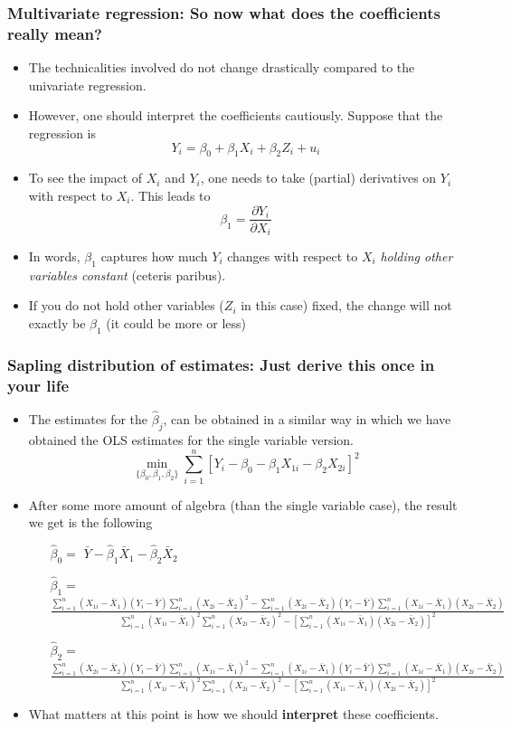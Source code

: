 \documentclass[aspectratio=169]{beamer}
\begin{document}
\begin{frame}
\frametitle{Multivariate regression: So now what does the coefficients really mean?}
\begin{itemize}
\item The technicalities involved do not change drastically compared to the univariate regression. 
\item However, one should interpret the coefficients cautiously. Suppose that the regression is
\[
Y_i = \beta_0 + \beta_1 X_i + \beta_2 Z_i+u_i
\]
\item To see the impact of $X_i$ and $Y_i$, one needs to take (partial) derivatives on $Y_i$ with respect to $X_i$. This leads to
\[
\beta_1 = \frac{\partial Y_i}{\partial X_i}
\]
\item In words, $\beta_1$ captures how much $Y_i$ changes with respect to $X_i$ \emph{holding other variables constant} (ceteris paribus).
\item If you do not hold other variables ($Z_i$ in this case) fixed, the change will not exactly be $\beta_1$ (it could be more or less)

\end{itemize}
\end{frame}

\begin{frame}
\frametitle{Sapling distribution of estimates: Just derive this once in your life}
\begin{itemize}
\item The estimates for the $\hat{\beta}_j$, can be obtained in a similar way in which we have obtained the OLS estimates for the single variable version.
\[
\min_{\{\beta_0,\beta_1,\beta_2\}} \sum_{i=1}^n[Y_i-\beta_0 - \beta_1X_{1i}-\beta_2X_{2i}]^2
\]
\item After some more amount of algebra (than the single variable case), the result we get is the following
\begin{itemize}
\item[$\hat{\beta}_0=$] $\bar{Y}-\hat{\beta}_1\bar{X}_1-\hat{\beta}_2\bar{X}_2$
\item[$\hat{\beta}_1=$] $\frac{\sum_{i=1}^n (X_{1i}-\bar{X}_1)(Y_{i}-\bar{Y})\sum_{i=1}^n(X_{2i}-\bar{X}_2)^2-\sum_{i=1}^n (X_{2i}-\bar{X}_2)(Y_{i}-\bar{Y})\sum_{i=1}^n(X_{1i}-\bar{X}_1)(X_{2i}-\bar{X}_2)}{\sum_{i=1}^n (X_{1i}-\bar{X}_1)^2\sum_{i=1}^n (X_{2i}-\bar{X}_2)^2-[\sum_{i=1}^n (X_{1i}-\bar{X}_1)(X_{2i}-\bar{X}_2)]^2}$
\item[$\hat{\beta}_2=$] $\frac{\sum_{i=1}^n (X_{2i}-\bar{X}_2)(Y_{i}-\bar{Y})\sum_{i=1}^n(X_{1i}-\bar{X}_1)^2-\sum_{i=1}^n (X_{1i}-\bar{X}_1)(Y_{i}-\bar{Y})\sum_{i=1}^n(X_{1i}-\bar{X}_1)(X_{2i}-\bar{X}_2)}{\sum_{i=1}^n (X_{1i}-\bar{X}_1)^2\sum_{i=1}^n (X_{2i}-\bar{X}_2)^2-[\sum_{i=1}^n (X_{1i}-\bar{X}_1)(X_{2i}-\bar{X}_2)]^2}$
\end{itemize} \par\medskip
\item What matters at this point is how we should \textbf{interpret} these coefficients. 
\end{itemize}
\end{frame}
\end{document}
